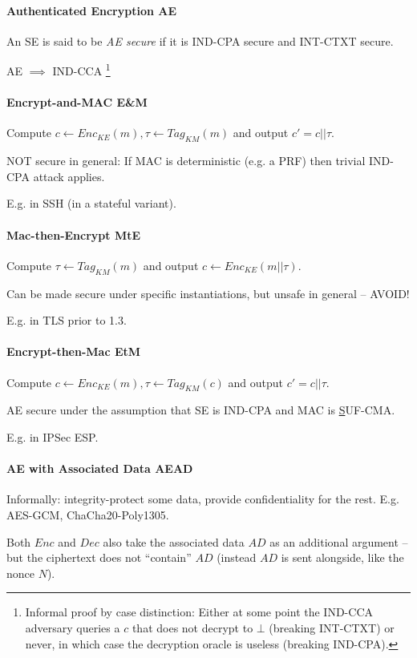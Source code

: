 \paragraph{Authenticated Encryption AE}
An SE is said to be \emph{AE secure} if it is IND-CPA secure and INT-CTXT secure.

AE $\implies$ IND-CCA%
\footnote{Informal proof by case distinction:
Either at some point the IND-CCA adversary queries a $c$ that does not decrypt to $\bot$ (breaking INT-CTXT) or never, in which case the decryption oracle is useless (breaking IND-CPA).
}

\paragraph{Encrypt-and-MAC E\&M}
Compute $c \leftarrow Enc_{KE}(m), \tau \leftarrow Tag_{KM}(m)$ and output $c'=c||\tau$.

NOT secure in general:
If MAC is deterministic (e.g. a PRF) then trivial IND-CPA attack applies.

E.g. in SSH (in a stateful variant).

\paragraph{Mac-then-Encrypt MtE}
Compute $\tau \leftarrow Tag_{KM}(m)$ and output $c \leftarrow Enc_{KE}(m||\tau)$.

Can be made secure under specific instantiations, but unsafe in general -- AVOID!

E.g. in TLS prior to 1.3.

\paragraph{Encrypt-then-Mac EtM}
Compute $c \leftarrow Enc_{KE}(m), \tau \leftarrow Tag_{KM}(c)$ and output $c'=c||\tau$.

AE secure under the assumption that SE is IND-CPA and MAC is \underline{S}UF-CMA.

E.g. in IPSec ESP.

\paragraph{AE with Associated Data AEAD}
Informally: integrity-protect some data, provide confidentiality for the rest.
E.g. AES-GCM, ChaCha20-Poly1305.

Both $Enc$ and $Dec$ also take the associated data $AD$ as an additional argument
-- but the ciphertext does not ``contain'' $AD$ (instead $AD$ is sent alongside, like the nonce $N$).

